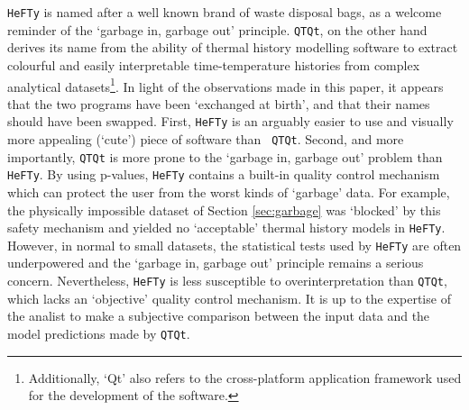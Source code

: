 \documentclass{article}
\begin{document}
{\tt HeFTy} is named after a well known brand of waste disposal bags,
as a welcome reminder of the `garbage in, garbage out' principle.
{\tt QTQt}, on the other hand derives its name from the ability of
thermal history modelling software to extract colourful and easily
interpretable time-temperature histories from complex analytical
datasets\footnote{Additionally, `Qt' also refers to the cross-platform
  application framework used for the development of the software.}.
In light of the observations made in this paper, it appears that the
two programs have been `exchanged at birth', and that their names
should have been swapped.  First, {\tt HeFTy} is an arguably easier to
use and visually more appealing (`cute') piece of software than {\tt
  QTQt}.  Second, and more importantly, {\tt QTQt} is more prone to
the `garbage in, garbage out' problem than {\tt HeFTy}. By using
p-values, {\tt HeFTy} contains a built-in quality control mechanism
which can protect the user from the worst kinds of `garbage' data. For
example, the physically impossible dataset of Section
\ref{sec:garbage} was `blocked' by this safety mechanism and yielded
no `acceptable' thermal history models in {\tt HeFTy}. However, in
normal to small datasets, the statistical tests used by {\tt HeFTy}
are often underpowered and the `garbage in, garbage out' principle
remains a serious concern. Nevertheless, {\tt HeFTy} is less
susceptible to overinterpretation than {\tt QTQt}, which lacks an
`objective' quality control mechanism. It is up to the expertise of
the analist to make a subjective comparison between the input data and
the model predictions made by {\tt QTQt}.\\
\end{document}
